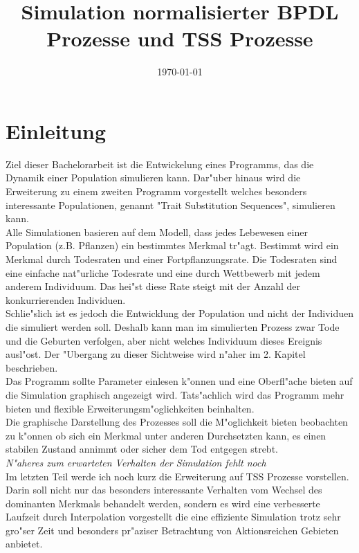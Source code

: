 \documentclass[11pt, a4paper, german]{article}
\date{\today}
\title{Simulation normalisierter BPDL Prozesse und TSS Prozesse}
\begin{document}
\maketitle
\tableofcontents



\clearpage
\section{Einleitung}
Ziel dieser Bachelorarbeit ist die Entwickelung eines Programms, das die Dynamik einer Population simulieren kann. Dar"uber hinaus wird die Erweiterung zu einem zweiten Programm vorgestellt welches besonders interessante Populationen, genannt "{}Trait Substitution Sequences"{}, simulieren kann.\\

Alle Simulationen basieren auf dem Modell, dass jedes Lebewesen einer Population (z.B. Pflanzen) ein bestimmtes Merkmal tr"agt. Bestimmt wird ein Merkmal durch Todesraten und einer Fortpflanzungsrate. Die Todesraten sind eine einfache nat"urliche Todesrate und eine durch Wettbewerb mit jedem anderem Individuum. Das hei"st diese Rate steigt mit der Anzahl der konkurrierenden Individuen.\\
Schlie"slich ist es jedoch die Entwicklung der Population und nicht der Individuen die simuliert werden soll. Deshalb kann man im simulierten Prozess zwar Tode und die Geburten verfolgen, aber nicht welches Individuum dieses Ereignis ausl"ost. Der "Ubergang zu dieser Sichtweise wird n"aher im 2. Kapitel beschrieben.\\

Das Programm sollte Parameter einlesen k"onnen und eine Oberfl"ache bieten auf die Simulation graphisch angezeigt wird. Tats"achlich wird das Programm mehr bieten und flexible Erweiterungsm"oglichkeiten beinhalten.\\
Die graphische Darstellung des Prozesses soll die M"oglichkeit bieten beobachten zu k"onnen ob sich ein Merkmal unter anderen Durchsetzten kann, es einen stabilen Zustand annimmt oder sicher dem Tod entgegen strebt.\\
\textit{N"aheres zum erwarteten Verhalten der Simulation fehlt noch}\\

Im letzten Teil werde ich noch kurz die Erweiterung auf TSS Prozesse vorstellen. Darin soll nicht nur das besonders interessante Verhalten vom Wechsel des dominanten Merkmals behandelt werden, sondern es wird eine verbesserte Laufzeit durch Interpolation vorgestellt die eine effiziente Simulation trotz sehr gro"ser Zeit und besonders pr"aziser Betrachtung von Aktionsreichen Gebieten anbietet.
\end{document}
